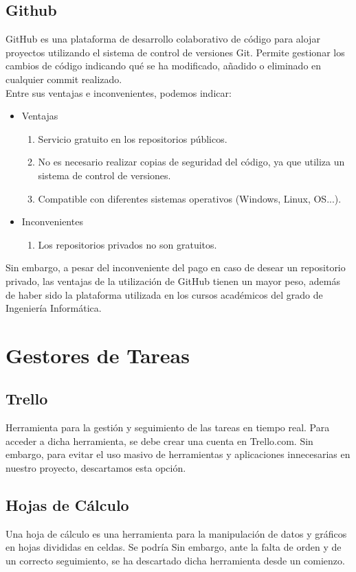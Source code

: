 \subsection{Github}
GitHub es una plataforma de desarrollo colaborativo de código para alojar proyectos utilizando el sistema de control de versiones Git.\nocite{git:gith} Permite gestionar los cambios de código indicando qué se ha modificado, añadido o eliminado en cualquier commit realizado. \\Entre sus ventajas e inconvenientes, podemos indicar: 
\begin{itemize}
\item Ventajas
\begin{enumerate}
\item Servicio gratuito en los repositorios públicos. 
\item No es necesario realizar copias de seguridad del código, ya que utiliza un sistema de control de versiones. 
\item Compatible con diferentes sistemas operativos (Windows, Linux, OS...). \nocite{gits:gitHub}
\end{enumerate}
\end{itemize}
\begin{itemize}
\item Inconvenientes
\begin{enumerate}
\item Los repositorios privados no son gratuitos. 
\end{enumerate}
\end{itemize}
Sin embargo, a pesar del inconveniente del pago en caso de desear un repositorio privado, las ventajas de la utilización de GitHub tienen un mayor peso, además de haber sido la plataforma utilizada en los cursos académicos del grado de Ingeniería Informática. 
\section{Gestores de Tareas}
\subsection{Trello}
Herramienta para la gestión y seguimiento\nocite{xelso:trello} de las tareas en tiempo real. Para acceder a dicha herramienta, se debe crear una cuenta en Trello.com. Sin embargo, para evitar el uso masivo de herramientas y aplicaciones innecesarias en nuestro proyecto, descartamos esta opción. 

\subsection{Hojas de Cálculo}
Una hoja de cálculo es una herramienta  para la manipulación de datos y gráficos en hojas divididas en celdas. Se podría  Sin embargo, ante la falta de orden y de un correcto seguimiento, se ha descartado dicha herramienta desde un comienzo. 
